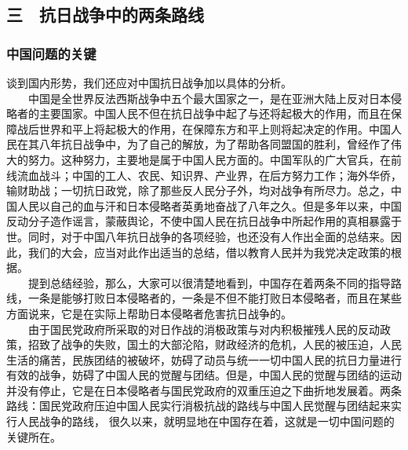 \documentclass[cn,11pt,chinese]{elegantbook}
\def\myformat#1{\hfil\hfil #1}
\begin{document}
\subsection*{\myformat{三　抗日战争中的两条路线}}
\subsubsection*{\myformat{中国问题的关键}}
谈到国内形势，我们还应对中国抗日战争加以具体的分析。\\
　　中国是全世界反法西斯战争中五个最大国家之一，是在亚洲大陆上反对日本侵略者的主要国家。中国人民不但在抗日战争中起了与还将起极大的作用，而且在保障战后世界和平上将起极大的作用，在保障东方和平上则将起决定的作用。中国人民在其八年抗日战争中，为了自己的解放，为了帮助各同盟国的胜利，曾经作了伟大的努力。这种努力，主要地是属于中国人民方面的。中国军队的广大官兵，在前线流血战斗；中国的工人、农民、知识界、产业界，在后方努力工作；海外华侨，输财助战；一切抗日政党，除了那些反人民分子外，均对战争有所尽力。总之，中国人民以自己的血与汗和日本侵略者英勇地奋战了八年之久。但是多年以来，中国反动分子造作谣言，蒙蔽舆论，不使中国人民在抗日战争中所起作用的真相暴露于世。同时，对于中国八年抗日战争的各项经验，也还没有人作出全面的总结来。因此，我们的大会，应当对此作出适当的总结，借以教育人民并为我党决定政策的根据。\\
　　提到总结经验，那么，大家可以很清楚地看到，中国存在着两条不同的指导路线，一条是能够打败日本侵略者的，一条是不但不能打败日本侵略者，而且在某些方面说来，它是在实际上帮助日本侵略者危害抗日战争的。\\
　　由于国民党政府所采取的对日作战的消极政策与对内积极摧残人民的反动政策，招致了战争的失败，国土的大部沦陷，财政经济的危机，人民的被压迫，人民生活的痛苦，民族团结的被破坏，妨碍了动员与统一一切中国人民的抗日力量进行有效的战争，妨碍了中国人民的觉醒与团结。但是，中国人民的觉醒与团结的运动并没有停止，它是在日本侵略者与国民党政府的双重压迫之下曲折地发展着。两条路线：国民党政府压迫中国人民实行消极抗战的路线与中国人民觉醒与团结起来实行人民战争的路线， 很久以来，就明显地在中国存在着，这就是一切中国问题的关键所在。\\
\end{document}
